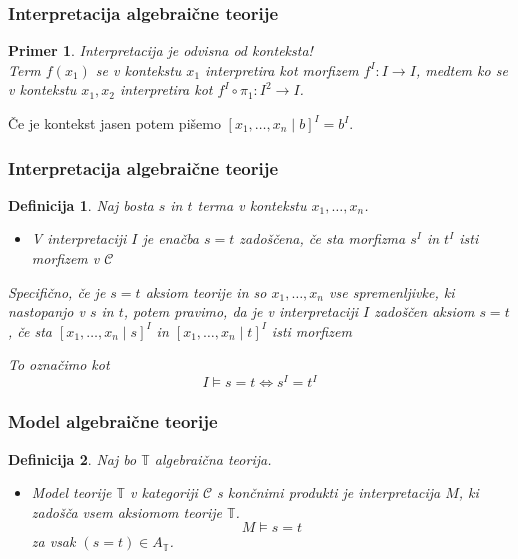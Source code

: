 \documentclass{beamer}
\newtheorem{definicija}{Definicija}
\newtheorem{primer}{Primer}
\begin{document}
\begin{frame}
\frametitle{Interpretacija algebraične teorije}
\begin{primer}
Interpretacija je odvisna od konteksta!\\
Term $f(x_1)$ se v kontekstu $x_1$ interpretira kot morfizem $f^I : I \to I$, medtem ko se v kontekstu $x_1, x_2$ interpretira kot $f^I \circ \pi_1 : I^2 \to I$.
\end{primer}
\vspace{1cm}
Če je kontekst jasen potem pišemo $[x_1, \ldots, x_n \mid b]^I = b^I$.
\end{frame}

\begin{frame}[fragile]
\frametitle{Interpretacija algebraične teorije}
\begin{definicija}
Naj bosta $s$ in $t$ terma v kontekstu $x_1, \ldots, x_n$. 
\begin{itemize}
\item V interpretaciji $I$ je enačba $s = t$ \emph{zadoščena}, če sta morfizma $s^I$ in $t^I$ isti morfizem v $\mathcal{C}$
\end{itemize}
\pause
Specifično, če je $s = t$ aksiom teorije in so $x_1, \ldots, x_n$ vse spremenljivke, ki nastopanjo v $s$ in $t$, potem pravimo, da je v interpretaciji $I$ \emph{zadoščen aksiom} $s = t$, če sta $[x_1, \ldots, x_n \mid s]^I$ in $[x_1, \ldots, x_n \mid t]^I$ isti morfizem
\begin{center}
\end{center}
\pause
To označimo kot
$$I \models s = t \Longleftrightarrow s^I = t^I$$
\end{definicija}
\end{frame}

\begin{frame}
\frametitle{Model algebraične teorije}
\begin{definicija}
Naj bo $\mathbb{T}$ algebraična teorija. 
\begin{itemize}
\pause
\item \emph{Model} teorije $\mathbb{T}$ v kategoriji $\mathcal{C}$ s končnimi produkti je interpretacija $M$, ki zadošča vsem aksiomom teorije $\mathbb{T}$.
$$M \models s = t$$ za vsak $(s = t) \in A_\mathbb{T}$.
\end{itemize}
\end{definicija}
\end{frame}
\end{document}
